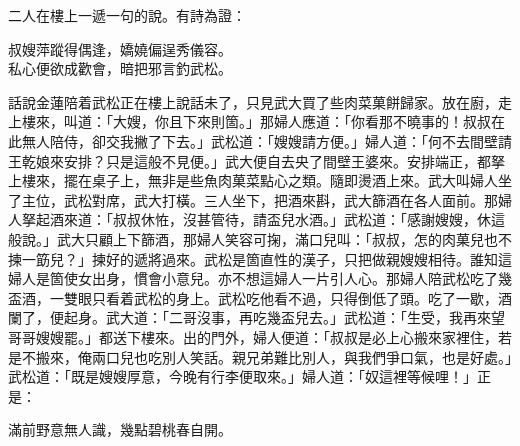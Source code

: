 二人在樓上一遞一句的說。有詩為證：

\begin{myquote}
叔嫂萍蹤得偶逢，嬌嬈偏逞秀儀容。\\
私心便欲成歡會，暗把邪言釣武松。
\end{myquote}

話說金蓮陪着武松正在樓上說話未了，只見武大買了些肉菜菓餅歸家。放在廚，走上樓來，叫道：「大嫂，你且下來則箇。」那婦人應道：「你看那不曉事的！叔叔在此無人陪侍，卻交我撇了下去。」{}武松道：「嫂嫂請方便。」婦人道：「何不去間壁請王乾娘來安排？{}只是這般不見便。」武大便自去央了間壁王婆來。安排端正，都拏上樓來，擺在桌子上，無非是些魚肉菓菜點心之類。隨即燙酒上來。武大叫婦人坐了主位，武松對席，武大打橫。三人坐下，把酒來斟，武大篩酒在各人面前。那婦人拏起酒來道：「叔叔休恠，沒甚管待，請盃兒水酒。」武松道：「感謝嫂嫂，休這般說。」武大只顧上下篩酒，那婦人笑容可掬，滿口兒叫：「叔叔，怎的肉菓兒也不揀一筯兒？」{}揀好的遞將過來。武松是箇直性的漢子，只把做親嫂嫂相待。誰知這婦人是箇使女出身，慣會小意兒。亦不想這婦人一片引人心。那婦人陪武松吃了幾盃酒，一雙眼只看着武松的身上。武松吃他看不過，只得倒低了頭。{}吃了一歇，酒闌了，便起身。武大道：「二哥沒事，再吃幾盃兒去。」武松道：「生受，我再來望哥哥嫂嫂罷。」都送下樓來。出的門外，婦人便道：「叔叔是必上心搬來家裡住，若是不搬來，俺兩口兒也吃別人笑話。親兄弟難比別人，與我們爭口氣，也是好處。」{}武松道：「既是嫂嫂厚意，今晚有行李便取來。」婦人道：「奴這裡等候哩！」正是：

\begin{myquote}
滿前野意無人識，幾點碧桃春自開。
\end{myquote}

